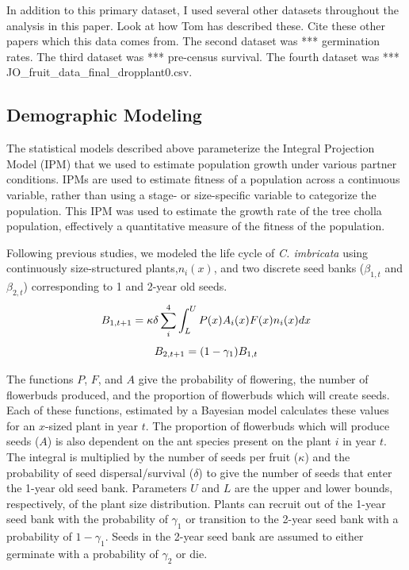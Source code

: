 \documentclass[12pt,a4paper]{article}
\begin{document}
{{In addition to this primary dataset, I used several other datasets throughout the analysis in this paper.  Look at how Tom has described these. Cite these other papers which this data comes from. 
The second dataset was *** germination rates.
The third dataset was *** pre-census survival.
The fourth dataset was *** JO_fruit_data_final_dropplant0.csv.

\subsection*{Demographic Modeling}

The statistical models described above parameterize the Integral Projection Model (IPM) that we used to estimate population growth under various partner conditions.  
IPMs are used to estimate fitness of a population across a continuous variable, rather than using a stage- or size-specific variable to categorize the population. 
This IPM was used to estimate the growth rate of the tree cholla population, effectively a quantitative measure of the fitness of the population. 

Following previous studies, we modeled the life cycle of \textit{C. imbricata} using continuously size-structured plants,$n_i(x)$, and two discrete seed banks ($\beta_{1,t}$ and $\beta_{2,t}$) corresponding to 1 and 2-year old seeds.
$$
B_{1, t+1} = \kappa \delta \sum_{i}^{4} \int_L^U P(x) A_i(x) F(x)n_i(x) dx \\
$$
$$
B_{2,t+1} =  (1 - \gamma_1)B_{1,t}\\
$$

The functions $P$, $F$, and $A$ give the probability of flowering, the number of flowerbuds produced, and the proportion of flowerbuds which will create seeds. 
Each of these functions, estimated by a Bayesian model calculates these values for an $x$-sized plant in year $t$. 
The proportion of flowerbuds which will produce seeds ($A$) is also dependent on the ant species present on the plant $i$ in year $t$. 
The integral is multiplied by the number of seeds per fruit ($\kappa$) and the probability of seed dispersal/survival ($\delta$) to give the number of seeds that enter the 1-year old seed bank. 
Parameters $U$ and $L$ are the upper and lower bounds, respectively, of the plant size distribution. 
Plants can recruit out of the 1-year seed bank with the probability of $\gamma_1$ or transition to the 2-year seed bank with a probability of $1 - \gamma_1$. 
Seeds in the 2-year seed bank are assumed to either germinate with a probability of $\gamma_2$ or die. 

}}
\end{document}
